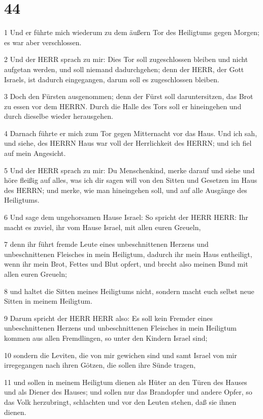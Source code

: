 \chapter{44}

\par 1 Und er führte mich wiederum zu dem äußern Tor des Heiligtums gegen Morgen; es war aber verschlossen.
\par 2 Und der HERR sprach zu mir: Dies Tor soll zugeschlossen bleiben und nicht aufgetan werden, und soll niemand dadurchgehen; denn der HERR, der Gott Israels, ist dadurch eingegangen, darum soll es zugeschlossen bleiben.
\par 3 Doch den Fürsten ausgenommen; denn der Fürst soll daruntersitzen, das Brot zu essen vor dem HERRN. Durch die Halle des Tors soll er hineingehen und durch dieselbe wieder herausgehen.
\par 4 Darnach führte er mich zum Tor gegen Mitternacht vor das Haus. Und ich sah, und siehe, des HERRN Haus war voll der Herrlichkeit des HERRN; und ich fiel auf mein Angesicht.
\par 5 Und der HERR sprach zu mir: Du Menschenkind, merke darauf und siehe und höre fleißig auf alles, was ich dir sagen will von den Sitten und Gesetzen im Haus des HERRN; und merke, wie man hineingehen soll, und auf alle Ausgänge des Heiligtums.
\par 6 Und sage dem ungehorsamen Hause Israel: So spricht der HERR HERR: Ihr macht es zuviel, ihr vom Hause Israel, mit allen euren Greueln,
\par 7 denn ihr führt fremde Leute eines unbeschnittenen Herzens und unbeschnittenen Fleisches in mein Heiligtum, dadurch ihr mein Haus entheiligt, wenn ihr mein Brot, Fettes und Blut opfert, und brecht also meinen Bund mit allen euren Greueln;
\par 8 und haltet die Sitten meines Heiligtums nicht, sondern macht euch selbst neue Sitten in meinem Heiligtum.
\par 9 Darum spricht der HERR HERR also: Es soll kein Fremder eines unbeschnittenen Herzens und unbeschnittenen Fleisches in mein Heiligtum kommen aus allen Fremdlingen, so unter den Kindern Israel sind;
\par 10 sondern die Leviten, die von mir gewichen sind und samt Israel von mir irregegangen nach ihren Götzen, die sollen ihre Sünde tragen,
\par 11 und sollen in meinem Heiligtum dienen als Hüter an den Türen des Hauses und als Diener des Hauses; und sollen nur das Brandopfer und andere Opfer, so das Volk herzubringt, schlachten und vor den Leuten stehen, daß sie ihnen dienen.
